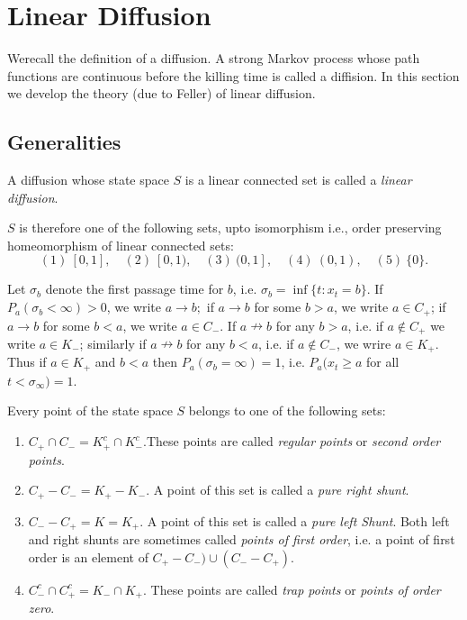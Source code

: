 \chapter{Linear Diffusion}%

We\pageoriginale recall the definition of a diffusion. A strong Markov
process whose 
path functions are continuous before the killing time is called a
diffision. In this section we develop the theory (due to Feller) of
linear diffusion. 

\section{Generalities}\label{chap6-sec1}%
\begin{defi*}
  A diffusion whose state space $S$ is a linear connected set is
  called  a {\em linear diffusion}. 
\end{defi*}

$S$ is therefore one of the following sets, upto isomorphism
i.e., order preserving homeomorphism of linear connected sets:   
$$
(1)~ [0, 1],\quad (2)~[0, 1),\quad  (3)~(0, 1],\quad (4)~(0, 1), \quad
(5)~\{ 0 \}. 
$$

Let $\sigma_b$ denote the first passage time for $b$, i.e. $\sigma_b
= \inf \{t : x_t = b \}$. If $P_a (\sigma_b < \infty ) > 0 $, we write
$a \rightarrow b;$ if $a \rightarrow b$ for some $b > a$, we write $a
\in C_+ $; if $a \rightarrow b$ for some $b < a$, we write $a \in
C_-$. If $a \nrightarrow b $ for any $b > a$, i.e. if $a \notin C_+$
we write $a \in K_-$; similarly if $a \nrightarrow b$ for any $b<a$,
i.e. if $a \not\in C_{-}$, we wrire $a \in K_+$. Thus if $a \in K_+$ and
$b<a$  then $P_a (\sigma_b = \infty) =1$, i.e. $P_a(x_t \geq a$ for
all $t< \sigma_\infty ) =1$. 

Every point of the state space $S$ belongs to one of the following sets:
\begin{enumerate}
\item $C_+ \cap C_- = K^c_+ \cap K^c_-$.\pageoriginale These points are called
  \textit{regular points} or \textit{second order points}. 

\item $C_+ - C_-= K_+-K_-$. A point of this set is called a
  \textit{pure right shunt}. 

\item $C_- -C_+ = K= K_+$. A point of this set is called a
  \textit{pure left Shunt}. Both left and right shunts are sometimes
  called \textit{points  of first order}, i.e. a point of first order
  is an element of $C_+ - C_{-}) \cup (C_{-}- C_+)$. 

\item $C^c_- \cap C^c_+ = K_- \cap K_+$. These points are called
  \textit{trap points} or \textit{points of order zero}. 
\end{enumerate}

